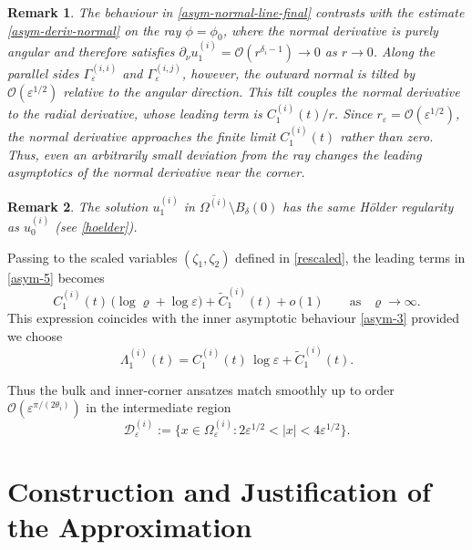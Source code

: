 \documentclass[reqno]{amsart}            %
\newtheorem{remark}{Remark}[section]
\numberwithin{equation}{section}
\begin{document}
	
	\begin{remark}
		The behaviour in \eqref{asym-normal-line-final} contrasts with the estimate
		\eqref{asym-deriv-normal} on the ray $\phi=\phi_0$, where the normal derivative
		is purely angular and therefore satisfies
		$\partial_\nu u^{(i)}_1=\mathcal{O}(r^{\delta_i-1})\to 0$ as $r\to 0$.
		Along the parallel sides $\Gamma_\varepsilon^{(i,i)}$ and
		$\Gamma_\varepsilon^{(i,j)}$, however, the outward normal is tilted by
		$\mathcal{O}(\varepsilon^{1/2})$ relative to the angular direction. This tilt
		couples the normal derivative to the radial derivative, whose leading term is
		$C^{(i)}_1(t)/r$. Since $r_\varepsilon=\mathcal{O}(\varepsilon^{1/2})$, the
		normal derivative approaches the finite limit $C^{(i)}_1(t)$ rather than zero.
		Thus, even an arbitrarily small deviation from the ray changes the leading
		asymptotics of the normal derivative near the corner.
	\end{remark}
	
	
	\begin{remark}\label{rem-2-8} The solution $u_1^{(i)}$ in $\overline{\Omega^{(i)}}\setminus B_\delta(0)$ has the same Hölder regularity
		as $u_0^{(i)}$ (see \eqref{hoelder}).	
	\end{remark}
	
	
	Passing to the scaled variables $(\zeta_1,\zeta_2)$ defined in \eqref{rescaled}, 
	the leading terms in \eqref{asym-5} becomes
	\begin{equation}\label{asym-behav-log}
		C_1^{(i)}(t)\,\big(\log\varrho + \log\varepsilon\big) + \widetilde{C}^{(i)}_1(t) + o(1)
		\qquad \text{as } \ \ \varrho\to\infty.
	\end{equation}
	This expression coincides with the inner asymptotic behaviour \eqref{asym-3}
	provided we choose
	\begin{equation}\label{Lambda}
		\Lambda^{(i)}_1(t)
		= C_1^{(i)}(t)\,\log\varepsilon + \widetilde{C}^{(i)}_1(t).
	\end{equation}
	
	Thus the bulk and inner-corner ansatzes match smoothly up to order
	$\mathcal{O}\!\left(\varepsilon^{\pi/(2\theta_i)}\right)$ in the intermediate
	region
	\begin{equation}\label{region-1}
		\mathcal{D}^{(i)}_{\varepsilon}
		:= \big\{x\in\Omega^{(i)}_\varepsilon :
		2\varepsilon^{1/2} < |x| < 4\varepsilon^{1/2}\big\}.
	\end{equation}
	
	
	\section{Construction and Justification of the Approximation}\label{Sect-4}
	
\end{document}
